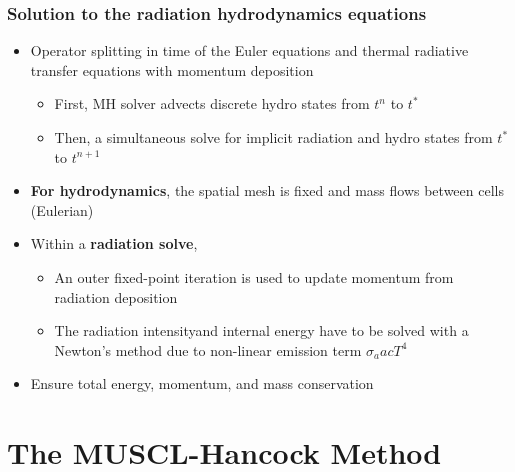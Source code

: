 \documentclass[xcolor=dvipsnames,fontsize=8pt]{beamer}
\newcommand{\colb}[1]{{\color{blue} #1}}
\newlength{\wideitemsep}
\let\olditem\item
\renewcommand{\item}{\setlength{\itemsep}{\wideitemsep}\olditem}
\begin{document}
\begin{frame}
    \frametitle{Solution to the radiation hydrodynamics equations}
     \begin{itemize}
         \item \colb{Operator splitting} in time of the Euler equations
            and thermal radiative transfer equations with momentum deposition 
            \begin{itemize}
                \item First, MH solver advects discrete hydro states from $t^n$ to
                    $t^*$
                \item Then, a simultaneous solve for implicit radiation and hydro
                    states from $t^*$ to
                    $t^{n+1}$
            \end{itemize}
        \item \textbf{For hydrodynamics}, the spatial mesh is fixed and mass flows between
            cells (Eulerian)
        \item Within a \textbf{radiation solve},
        \begin{itemize}
             \item An outer fixed-point iteration is
            used to update momentum from radiation deposition
            \item The radiation intensityand internal energy have to be solved with a Newton's method due to
            non-linear emission term $\sigma_a a c T^4$
        \end{itemize}
        \item Ensure total energy, momentum, and mass conservation
     \end{itemize}
\end{frame}

\section{The MUSCL-Hancock Method}
\subsection{}
\end{document}
